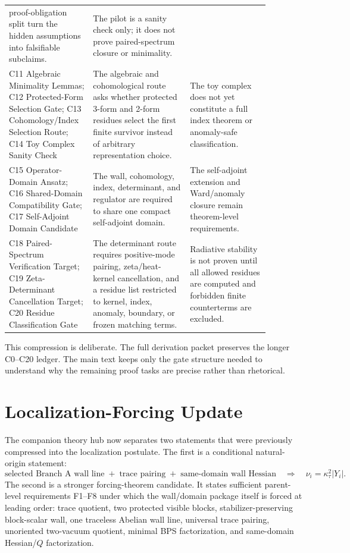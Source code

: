 \documentclass[11pt]{article}
\begin{document}
\begin{center}
\begin{tabular}{p{0.25\linewidth}p{0.34\linewidth}p{0.28\linewidth}}
proof-obligation split turn the hidden assumptions into falsifiable subclaims. &
The pilot is a sanity check only; it does not prove paired-spectrum closure or
minimality.\\
C11 Algebraic Minimality Lemmas; C12 Protected-Form Selection Gate; C13 Cohomology/Index Selection Route; C14 Toy Complex Sanity Check &
The algebraic and cohomological route asks whether protected 3-form and 2-form
residues select the first finite survivor instead of arbitrary representation
choice. &
The toy complex does not yet constitute a full index theorem or anomaly-safe
classification.\\
C15 Operator-Domain Ansatz; C16 Shared-Domain Compatibility Gate; C17 Self-Adjoint Domain Candidate &
The wall, cohomology, index, determinant, and regulator are required to share
one compact self-adjoint domain. &
The self-adjoint extension and Ward/anomaly closure remain theorem-level
requirements.\\
C18 Paired-Spectrum Verification Target; C19 Zeta-Determinant Cancellation Target; C20 Residue Classification Gate &
The determinant route requires positive-mode pairing, zeta/heat-kernel
cancellation, and a residue list restricted to kernel, index, anomaly, boundary,
or frozen matching terms. &
Radiative stability is not proven until all allowed residues are computed and
forbidden finite counterterms are excluded.\\
\bottomrule
\end{tabular}
\end{center}

This compression is deliberate.  The full derivation packet preserves the
longer C0--C20 ledger.  The main text keeps only the gate structure needed to
understand why the remaining proof tasks are precise rather than rhetorical.

\section{Localization-Forcing Update}
The companion theory hub now separates two statements that were previously
compressed into the localization postulate.  The first is a conditional
natural-origin statement:
\begin{equation}
\text{selected Branch A wall line}
\;+\;
\text{trace pairing}
\;+\;
\text{same-domain wall Hessian}
\quad\Longrightarrow\quad
\nu_i=\kappa_\tau^2|Y_i| .
\end{equation}
The second is a stronger forcing-theorem candidate.  It states sufficient
parent-level requirements F1--F8 under which the wall/domain package itself is
forced at leading order: trace quotient, two protected visible blocks,
stabilizer-preserving block-scalar wall, one traceless Abelian wall line,
universal trace pairing, unoriented two-vacuum quotient, minimal BPS
factorization, and same-domain Hessian/$Q$ factorization.
\end{document}
